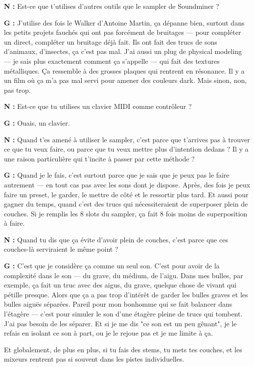 ﻿\documentclass[12pt]{article}
\begin{document}
\textbf{N :} Est-ce que t'utilises d'autres outils que le sampler de Soundminer ? 

\textbf{G :} J'utilise des fois le Walker d'Antoine Martin, ça dépanne bien, surtout dans les petits projets fauchés qui ont pas forcément de bruitages — pour compléter un direct, compléter un bruitage déjà fait. Ils ont fait des trucs de sons d'animaux, d'insectes, ça c'est pas mal. J'ai aussi un plug de physical modeling — je sais plus exactement comment ça s'appelle — qui fait des textures métalliques. Ça ressemble à des grosses plaques qui rentrent en résonance. Il y a un film où ça m'a pas mal servi pour amener des couleurs dark. Mais sinon, non, pas trop. 

\textbf{N :} Est-ce que tu utilises un clavier MIDI comme contrôleur ? 

\textbf{G :} Ouais, un clavier. 

\textbf{N :} Quand t'es amené à utiliser le sampler, c'est parce que t'arrives pas à trouver ce que tu veux faire, ou parce que tu veux mettre plus d'intention dedans ? Il y a une raison particulière qui t'incite à passer par cette méthode ? 

\textbf{G :} Quand je le fais, c'est surtout parce que je sais que je peux pas le faire autrement — en tout cas pas avec les sons dont je dispose. Après, des fois je peux faire un preset, le garder, le mettre de côté et le ressortir plus tard. Et aussi pour gagner du temps, quand c'est des trucs qui nécessiteraient de superposer plein de couches. Si je remplis les 8 slots du sampler, ça fait 8 fois moins de superposition à faire. 

\textbf{N :} Quand tu dis que ça évite d'avoir plein de couches, c'est parce que ces couches-là serviraient le même point ? 

\textbf{G :} C'est que je considère ça comme un seul son. C'est pour avoir de la complexité dans le son — du grave, du médium, de l'aigu. Dans mes bulles, par exemple, ça fait un truc avec des aigus, du grave, quelque chose de vivant qui pétille presque. Alors que ça a pas trop d'intérêt de garder les bulles graves et les bulles aiguës séparées. Pareil pour mon bonhomme qui se fait balancer dans l'étagère — c'est pour simuler le son d'une étagère pleine de trucs qui tombent. J'ai pas besoin de les séparer. Et si je me dis "ce son est un peu gênant", je le refais en isolant ce son à part, ou je le rejoue pas et je me limite à ça. 

Et globalement, de plus en plus, si tu fais des stems, tu mets tes couches, et les mixeurs rentrent pas si souvent dans les pistes individuelles. 
\end{document}
